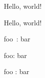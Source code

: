 

Hello, world!

\InterCharNodeOn
Hello, world!

\InterCharNodeOff

\hsize=1pt
foo\ : bar

\InterCharNodeOn
foo: bar

foo : bar

\InterCharNodeOff
\bye
